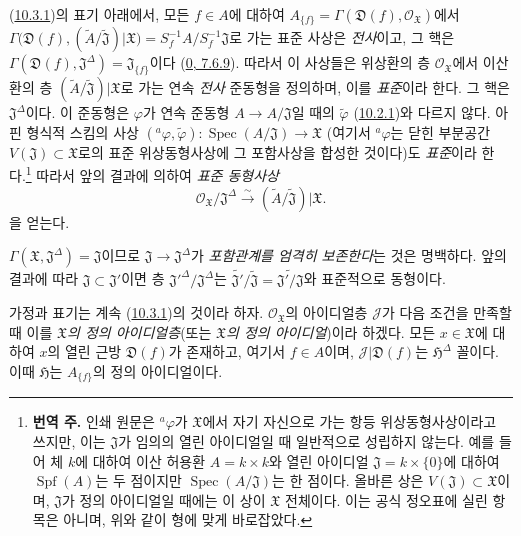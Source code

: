 \begin{env}[10.3.2]
\label{I.10.3.2-ko}
(\hyperref[I.10.3.1-ko]{10.3.1})의 표기 아래에서, 모든 $f\in A$에
대하여
$A_{\{f\}}=\Gamma(\mathfrak{D}(f),\mathscr{O}_{\mathfrak{X}})$에서
$\Gamma\bigl(\mathfrak{D}(f),
(\widetilde{A}/\widetilde{\mathfrak{J}})|\mathfrak{X}\bigr)
=S_f^{-1}A/S_f^{-1}\mathfrak{J}$로 가는 표준 사상은 \emph{전사}이고,
그 핵은
$\Gamma(\mathfrak{D}(f),\mathfrak{J}^\Delta)=\mathfrak{J}_{\{f\}}$이다
(\hyperref[0.7.6.9-ko]{0, 7.6.9}). 따라서 이 사상들은 위상환의 층
$\mathscr{O}_{\mathfrak{X}}$에서 이산환의 층
$(\widetilde{A}/\widetilde{\mathfrak{J}})|\mathfrak{X}$로 가는 연속
\emph{전사} 준동형을 정의하며, 이를 \emph{표준}이라 한다. 그 핵은
$\mathfrak{J}^\Delta$이다. 이 준동형은
$\varphi$가 연속 준동형 $A\to A/\mathfrak{J}$일 때의
$\widetilde{\varphi}$
(\hyperref[I.10.2.1-ko]{10.2.1})와 다르지 않다. 아핀 형식적 스킴의 사상
$({}^a\varphi,\widetilde{\varphi}):
\operatorname{Spec}(A/\mathfrak{J})\to\mathfrak{X}$
(여기서 ${}^a\varphi$는 닫힌 부분공간
$V(\mathfrak{J})\subset\mathfrak{X}$로의 표준 위상동형사상에 그
포함사상을 합성한 것이다)도 \emph{표준}이라 한다.\footnote{\textbf{번역 주.} 인쇄 원문은
${}^a\varphi$가 $\mathfrak{X}$에서 자기 자신으로 가는 항등
위상동형사상이라고 쓰지만, 이는 $\mathfrak{J}$가 임의의 열린 아이디얼일
때 일반적으로 성립하지 않는다. 예를 들어 체 $k$에 대하여 이산 허용환
$A=k\times k$와 열린 아이디얼 $\mathfrak{J}=k\times\{0\}$에 대하여
$\operatorname{Spf}(A)$는 두 점이지만
$\operatorname{Spec}(A/\mathfrak{J})$는 한 점이다. 올바른 상은
$V(\mathfrak{J})\subset\mathfrak{X}$이며, $\mathfrak{J}$가 정의
아이디얼일 때에는 이 상이 $\mathfrak{X}$ 전체이다. 이는 공식 정오표에
실린 항목은 아니며, 위와 같이 형에 맞게 바로잡았다.} 따라서 앞의
결과에 의하여 \emph{표준 동형사상}
\[
  \mathscr{O}_{\mathfrak{X}}/\mathfrak{J}^\Delta
  \xrightarrow{\sim}
  (\widetilde{A}/\widetilde{\mathfrak{J}})|\mathfrak{X}.
  \tag{10.3.2.1}\label{I.10.3.2.1-ko}
\]
을 얻는다.

$\Gamma(\mathfrak{X},\mathfrak{J}^\Delta)=\mathfrak{J}$이므로
$\mathfrak{J}\to\mathfrak{J}^\Delta$가
\emph{포함관계를 엄격히 보존한다}는 것은 명백하다. 앞의 결과에 따라
$\mathfrak{J}\subset\mathfrak{J}'$이면 층
${\mathfrak{J}'}^\Delta/\mathfrak{J}^\Delta$는
$\widetilde{\mathfrak{J}'}/\widetilde{\mathfrak{J}}
=\widetilde{\mathfrak{J}'/\mathfrak{J}}$와 표준적으로 동형이다.
\end{env}

\begin{env}[10.3.3]
\label{I.10.3.3-ko}
가정과 표기는 계속
(\hyperref[I.10.3.1-ko]{10.3.1})의 것이라 하자.
$\mathscr{O}_{\mathfrak{X}}$의 아이디얼층 $\mathscr{J}$가 다음 조건을
만족할 때 이를 \emph{$\mathfrak{X}$의 정의 아이디얼층}(또는
\emph{$\mathfrak{X}$의 정의 아이디얼})이라 하겠다. 모든
$x\in\mathfrak{X}$에 대하여 $x$의 열린 근방 $\mathfrak{D}(f)$가
존재하고, 여기서 $f\in A$이며,
$\mathscr{J}|\mathfrak{D}(f)$는 $\mathfrak{H}^\Delta$ 꼴이다. 이때
$\mathfrak{H}$는 $A_{\{f\}}$의 정의 아이디얼이다.
\end{env}

